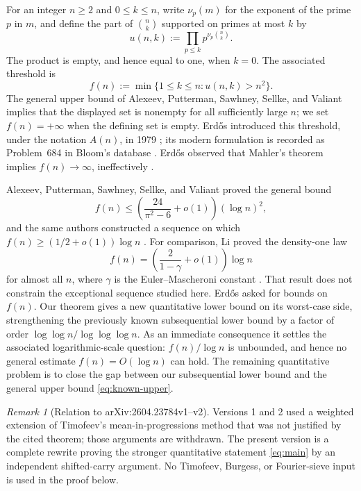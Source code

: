 \documentclass[11pt]{article}
\theoremstyle{remark}
\newtheorem{remark}[theorem]{Remark}
\begin{document}
For an integer \(n\geq2\) and \(0\leq k\leq n\), write \(\nu_p(m)\) for
the exponent of the prime \(p\) in \(m\), and define the part of
\(\binom nk\) supported on primes at most \(k\) by
\begin{equation}\label{eq:def-u}
 u(n,k):=\prod_{p\leq k}p^{\nu_p\binom nk}.
\end{equation}
The product is empty, and hence equal to one, when \(k=0\).
The associated threshold is
\begin{equation}\label{eq:def-f}
 f(n):=\min\{1\leq k\leq n:u(n,k)>n^2\}.
\end{equation}
The general upper bound of Alexeev, Putterman, Sawhney, Sellke, and Valiant
\cite{APSSV26} implies that the displayed set is nonempty for all
sufficiently large \(n\); we set \(f(n)=+\infty\) when the defining set is
empty.
Erd\H{o}s introduced this threshold, under the notation \(A(n)\),
in 1979 \cite[pp.~76--77]{Erdos1979}; its modern formulation is recorded as
Problem~684 in Bloom's database \cite{Bloom684}.  Erd\H{o}s observed that
Mahler's theorem implies \(f(n)\to\infty\), ineffectively
\cite{Mahler1953}.

Alexeev, Putterman, Sawhney, Sellke, and Valiant proved the general bound
\begin{equation}\label{eq:known-upper}
 f(n)\leq
 \left(\frac{24}{\pi^2-6}+o(1)\right)(\log n)^2,
\end{equation}
and the same authors constructed a sequence on which
\(f(n)\geq(1/2+o(1))\log n\) \cite[Theorem~2.1]{APSSV26}.
For comparison, Li proved the density-one law
\[
 f(n)=\left(\frac{2}{1-\gamma}+o(1)\right)\log n
\]
for almost all \(n\), where \(\gamma\) is the Euler--Mascheroni constant
\cite{Li2026}.  That result does not constrain the exceptional sequence
studied here.  Erd\H{o}s asked for bounds on \(f(n)\).
Our theorem gives a new quantitative lower bound on its worst-case side,
strengthening the previously known subsequential lower bound by a factor of
order \(\log\log n/\log\log\log n\).  As an immediate consequence it settles
the associated logarithmic-scale question: \(f(n)/\log n\) is unbounded, and
hence no general estimate \(f(n)=O(\log n)\) can hold.  The remaining
quantitative problem is to close the gap between our subsequential lower bound
and the general upper bound \eqref{eq:known-upper}.

\begin{remark}[Relation to arXiv:2604.23784v1--v2]
\label{rem:version-history}
Versions 1 and 2 used a weighted extension of Timofeev's
mean-in-progressions method \cite{Timofeev1997} that was not justified by the
cited theorem; those arguments are withdrawn.  The present version is a
complete rewrite proving the stronger quantitative statement
\eqref{eq:main} by an independent shifted-carry argument.  No Timofeev,
Burgess, or Fourier-sieve input is used in the proof below.
\end{remark}
\end{document}

